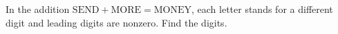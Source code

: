 In the addition $\text{SEND}+\text{MORE}=\text{MONEY}$, each letter stands for a different digit and leading digits are nonzero. Find the digits.
